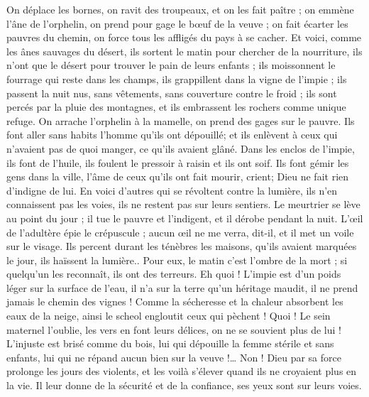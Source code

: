 \begin{multicols}{2}
On déplace les bornes, on ravit des troupeaux, et on les fait paître ;
on emmène l'âne de l'orphelin, on prend pour gage le bœuf de la veuve ;
on fait écarter les pauvres du chemin, on force tous les affligés du pays à se cacher.
Et voici, comme les ânes sauvages du désert, ils sortent le matin pour chercher de la nourriture, ils n'ont que le désert pour trouver le pain de leurs enfants ;
ils moissonnent le fourrage qui reste dans les champs, ils grappillent dans la vigne de l'impie ;
ils passent la nuit nus, sans vêtements, sans couverture contre le froid ;
ils sont percés par la pluie des montagnes, et ils embrassent les rochers comme unique refuge.
On arrache l'orphelin à la mamelle, on prend des gages sur le pauvre.
Ils font aller sans habits l'homme qu'ils ont dépouillé; et ils enlèvent à ceux qui n'avaient pas de quoi manger, ce qu'ils avaient glâné.
Dans les enclos de l'impie, ils font de l'huile, ils foulent le pressoir à raisin et ils ont soif.
Ils font gémir les gens dans la ville, l'âme de ceux qu'ils ont fait mourir, crient; Dieu ne fait rien d'indigne de lui.
En voici d'autres qui se révoltent contre la lumière, ils n'en connaissent pas les voies, ils ne restent pas sur leurs sentiers.
Le meurtrier se lève au point du jour ; il tue le pauvre et l'indigent, et il dérobe pendant la nuit.
L'œil de l'adultère épie le crépuscule ; aucun œil ne me verra, dit-il, et il met un voile sur le visage.
Ils percent durant les ténèbres les maisons, qu'ils avaient marquées le jour, ils haïssent la lumière..
Pour eux, le matin c'est l'ombre de la mort ; si quelqu'un les reconnaît, ils ont des terreurs.
Eh quoi ! L'impie est d'un poids léger sur la surface de l'eau, il n'a sur la terre qu'un héritage maudit, il ne prend jamais le chemin des vignes !
Comme la sécheresse et la chaleur absorbent les eaux de la neige, ainsi le scheol engloutit ceux qui pèchent !
Quoi ! Le sein maternel l'oublie, les vers en font leurs délices, on ne se souvient plus de lui ! L'injuste est brisé comme du bois,
lui qui dépouille la femme stérile et sans enfants, lui qui ne répand aucun bien sur la veuve !…
Non ! Dieu par sa force prolonge les jours des violents, et les voilà s'élever quand ils ne croyaient plus en la vie.
Il leur donne de la sécurité et de la confiance, ses yeux sont sur leurs voies.

\end{multicols}
